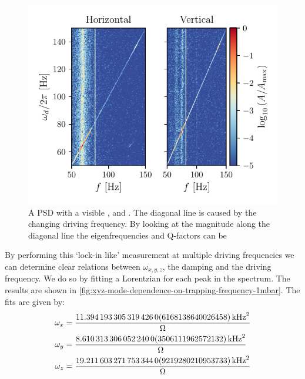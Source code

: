 \begin{figure}
    \centering
    \includegraphics{figures/data/xyz_mode_spectrum.pdf}
    \caption{A PSD with a visible \xmode, \ymode and \zmode. The diagonal line is caused by the changing driving frequency. By looking at the magnitude along the diagonal line the eigenfrequencies and Q-factors can be }
    \label{fig:xyz-mode-spectrum-1mbar}
\end{figure}

By performing this `lock-in like' measurement at multiple driving frequencies we can determine clear relations between $\omega_{x,y,z}$, the damping and the driving frequency. We do so by fitting a Lorentzian for each peak in the spectrum. The results are shown in \autoref{fig:xyz-mode-dependence-on-trapping-frequency-1mbar}. The fits are given by:
\begin{align*}
    \omega_x &= \frac{\qty{ 11.394193305319426 \pm 0.6168138640026458 }{\square\kilo\hertz}}{\Omega} \\ %
    \omega_y &= \frac{\qty{ 8.61031330605224 \pm 0.3506111962572132 }{\square\kilo\hertz}}{\Omega} \\ %
    \omega_z &= \frac{\qty{ 19.211603271753344 \pm 0.9219280210953733 }{\square\kilo\hertz}}{\Omega} %
\end{align*}

